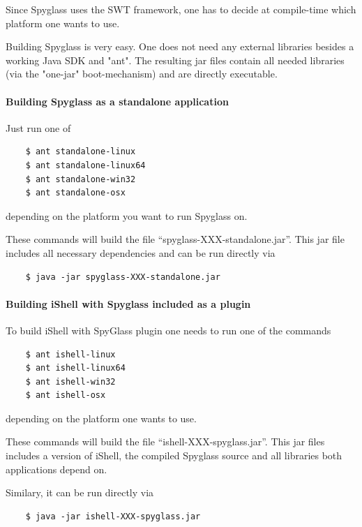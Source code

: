 Since Spyglass uses the SWT framework, one has to
decide at compile-time which platform one wants to use.

Building Spyglass is very easy. One does not need any external
libraries besides a working Java SDK and "ant".
The resulting jar files contain all needed libraries (via the
"one-jar" boot-mechanism) and are directly executable.


\paragraph{Building Spyglass as a standalone application}

Just run one of

\begin{verbatim}
    $ ant standalone-linux
    $ ant standalone-linux64
    $ ant standalone-win32
    $ ant standalone-osx
\end{verbatim}

depending on the platform you want to run Spyglass on.

These commands will build the file ``spyglass-XXX-standalone.jar''.
This jar file includes all necessary dependencies and can be run directly via

\begin{verbatim}
    $ java -jar spyglass-XXX-standalone.jar
\end{verbatim}

\paragraph{Building iShell with Spyglass included as a plugin}

To build iShell with SpyGlass plugin one needs to run one of the commands

\begin{verbatim}
    $ ant ishell-linux
    $ ant ishell-linux64
    $ ant ishell-win32
    $ ant ishell-osx
\end{verbatim}

depending on the platform one wants to use.

These commands will build the file ``ishell-XXX-spyglass.jar''.
This jar files includes a version of iShell, the compiled Spyglass source
and all libraries both applications depend on.

Similary, it can be run directly via

\begin{verbatim}
    $ java -jar ishell-XXX-spyglass.jar
\end{verbatim}

